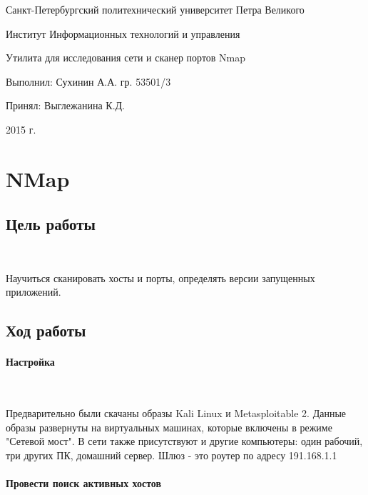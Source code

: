\documentclass{article}
\begin{document}
\begin{titlepage} \begin{center}

	\Large			
Санкт-Петербургский политехнический университет Петра Великого
			
	\vspace{0.2cm}	
Институт Информационных технологий и управления
		
	\vspace{2cm} \vfill \huge
Утилита для исследования сети и сканер портов Nmap
		
	\vfill 
	\begin{flushleft} \large \hangindent=8cm 
Выполнил: Сухинин А.А. гр. 53501/3 \hrulefill
			
Принял: Выглежанина К.Д. \hrulefill
	\end{flushleft}
		
	\vspace{2cm} \vfill \LARGE
2015 г.
		
\end{center} \end{titlepage}

\section{NMap}

\subsection{Цель работы}
~

Научиться сканировать хосты и порты, определять версии запущенных приложений.

\subsection{Ход работы}

\paragraph{Настройка}
~

Предварительно были скачаны образы Kali Linux и Metasploitable 2. Данные образы развернуты на виртуальных машинах, которые включены в режиме "Сетевой мост". В сети также присутствуют и другие компьютеры: один рабочий, три других ПК, домашний сервер. Шлюз - это роутер по адресу 191.168.1.1

\paragraph{Провести поиск активных хостов}
~
\end{document}
